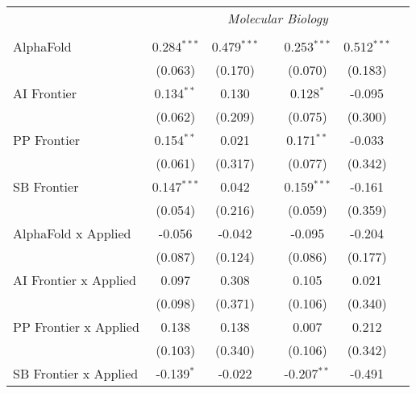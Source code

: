 \begin{tabular}{lcccccc}
 & \multicolumn{6}{c}{\textit{Molecular Biology}} \\ \\
   AlphaFold                      & 0.284$^{***}$ & 0.479$^{***}$ &                & 0.253$^{***}$ & 0.512$^{***}$ &   \\   
                                  & (0.063)       & (0.170)       &                & (0.070)       & (0.183)       &   \\   
   AI Frontier                    & 0.134$^{**}$  & 0.130         &                & 0.128$^{*}$   & -0.095        &   \\   
                                  & (0.062)       & (0.209)       &                & (0.075)       & (0.300)       &   \\   
   PP Frontier                    & 0.154$^{**}$  & 0.021         &                & 0.171$^{**}$  & -0.033        &   \\   
                                  & (0.061)       & (0.317)       &                & (0.077)       & (0.342)       &   \\   
   SB Frontier                    & 0.147$^{***}$ & 0.042         &                & 0.159$^{***}$ & -0.161        &   \\   
                                  & (0.054)       & (0.216)       &                & (0.059)       & (0.359)       &   \\   
   AlphaFold x Applied            & -0.056        & -0.042        &                & -0.095        & -0.204        &   \\   
                                  & (0.087)       & (0.124)       &                & (0.086)       & (0.177)       &   \\   
   AI Frontier x Applied          & 0.097         & 0.308         &                & 0.105         & 0.021         &   \\   
                                  & (0.098)       & (0.371)       &                & (0.106)       & (0.340)       &   \\   
   PP Frontier x Applied          & 0.138         & 0.138         &                & 0.007         & 0.212         &   \\   
                                  & (0.103)       & (0.340)       &                & (0.106)       & (0.342)       &   \\   
   SB Frontier x Applied          & -0.139$^{*}$  & -0.022        &                & -0.207$^{**}$ & -0.491        &   \\   

\end{tabular}
